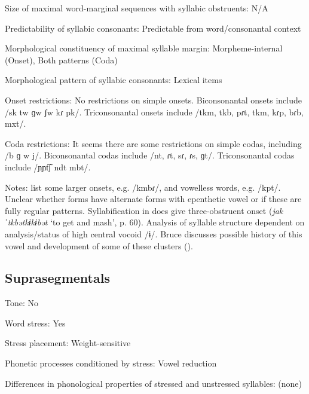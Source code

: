 {\begin{appendixdesc}
\item[Size of maximal word-marginal sequences with syllabic obstruents:] N/A

\item[Predictability of syllabic consonants:] Predictable from word/consonantal context

\item[Morphological constituency of maximal syllable margin:] Morpheme-internal (Onset), Both patterns (Coda)

\item[Morphological pattern of syllabic consonants:] Lexical items

\item[Onset restrictions:] No restrictions on simple onsets. Biconsonantal onsets include /sk tw ɡw ʃw kɾ pk/. Triconsonantal onsets include /tkm, tkb, pɾt, tkm, kɾp, bɾb, mxt/.

\item[Coda restrictions:] It seems there are some restrictions on simple codas, including /b ɡ w j/. Biconsonantal codas include /nt, ɾt, sɾ, ɾs, ɡt/. Triconsonantal codas include /ɲɲt͡ʃ ndt mbt/.

\item[Notes:] \citet{EdmistonEdmiston2003} list some larger onsets, e.g. /kmbɾ/, and vowelless words, e.g. /kpt/. Unclear whether forms have alternate forms with epenthetic vowel or if these are fully regular patterns. Syllabification in \citet{Bruce1984} does give three-obstruent onset (\textit{jakˈtkbətkɨkɨbət} ‘to get and mash’, p. 60). Analysis of syllable structure dependent on analysis/status of high central vocoid /ɨ/. Bruce discusses possible history of this vowel and development of some of these clusters (\citeyear[69--70]{Bruce1984}).
\end{appendixdesc}
\subsection*{Suprasegmentals}
\begin{appendixdesc}
\item[Tone:] No

\item[Word stress:] Yes

\item[Stress placement:] Weight-sensitive

\item[Phonetic processes conditioned by stress:] Vowel reduction

\item[Differences in phonological properties of stressed and unstressed syllables:] (none)


\end{appendixdesc}}
